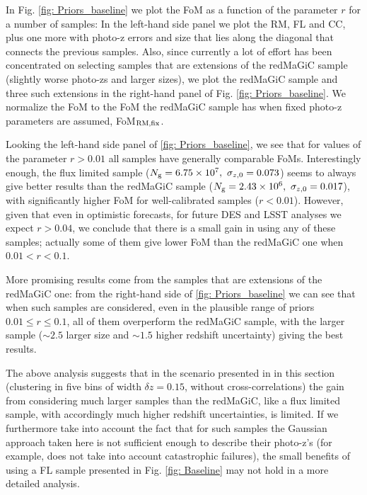 \documentclass[a4paper,fleqn,usenatbib]{mnras}
\begin{document}
In Fig. \ref{fig: Priors_baseline} we plot the FoM as a function of the parameter $r$ for a number of samples: In the left-hand side panel we plot the RM, FL and CC, plus one more with photo-z errors and size that lies along the diagonal that connects the previous samples. Also, since currently  a lot of effort has been concentrated on selecting samples that are extensions of the redMaGiC sample (slightly worse photo-zs and larger sizes), we plot the redMaGiC sample and three such extensions in the right-hand panel of Fig. \ref{fig: Priors_baseline}. We normalize the FoM to the FoM the redMaGiC sample has when fixed photo-z parameters are assumed, FoM$_{\mbox{\scriptsize{RM,fix}}}$.

Looking the left-hand side panel of \ref{fig: Priors_baseline},  we see that for values of the parameter $r > 0.01$ all samples have generally comparable FoMs. Interestingly enough, the flux limited sample ($N_{\mbox{\scriptsize{g}}} = 6.75 \times 10^7, \,\, \sigma_{z,0} = 0.073$) seems to always give better results than the redMaGiC sample ($N_{\mbox{\scriptsize{g}}} = 2.43 \times 10^6, \,\, \sigma_{z,0} = 0.017$), with significantly higher FoM for well-calibrated samples ($r<0.01$). However, given that even in optimistic forecasts, for future DES and LSST analyses we expect $r > 0.04$, we conclude that there is a small gain in using any of these samples; actually some of them give lower FoM than the redMaGiC one when $0.01 < r < 0.1$.

More promising results come from the samples that are extensions of the redMaGiC one: from the right-hand side of \ref{fig: Priors_baseline} we can see that when such samples are considered, even in the plausible range of priors $0.01 \leq r \leq 0.1$, all of them overperform the redMaGiC sample, with the larger sample ($\sim 2.5$ larger size and $\sim 1.5$ higher redshift uncertainty) giving the best results.

The above analysis suggests that in the scenario presented in in this section (clustering in five bins of width $\delta z = 0.15$, without cross-correlations) the gain from considering much larger samples than the redMaGiC, like a flux limited sample, with accordingly much higher redshift uncertainties, is limited. If we furthermore take into account the fact that for such samples the Gaussian approach taken here is not sufficient enough to describe their photo-z's (for example, does not take into account catastrophic failures), the small benefits of using a FL sample presented in Fig. \ref{fig: Baseline} may not hold in a more detailed analysis. 
\end{document}
